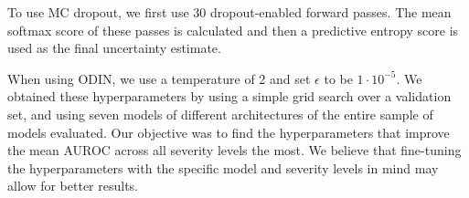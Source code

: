 \documentclass[table]{article} \usepackage{PRIMEarxiv}
\begin{document}
To use MC dropout, we first use 30 dropout-enabled forward passes. 
The mean softmax score of these passes is calculated and then a predictive entropy score is used as the final uncertainty estimate.

When using ODIN, we use a temperature of 2 and set $\epsilon$ to be $1 \cdot 10^{-5}$. We obtained these hyperparameters by using a simple grid search over a validation set, and using seven models of different architectures of the entire sample of models evaluated. Our objective was to find the hyperparameters that improve the mean AUROC across all severity levels the most.
We believe that fine-tuning the hyperparameters with the specific model and severity levels in mind may allow for better results.
\end{document}
